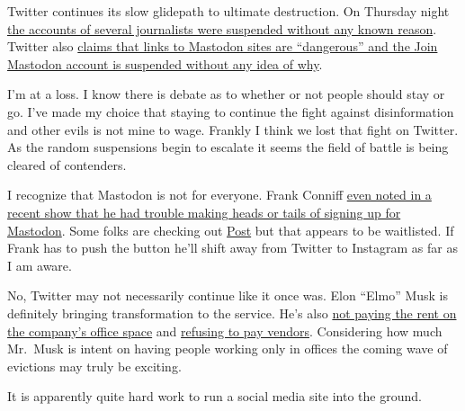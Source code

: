 Twitter continues its slow glidepath to ultimate destruction. On
Thursday night
\href{http://web.archive.org/web/20221216015528/https://www.axios.com/2022/12/16/elon-musk-twitter-free-speech-journalists-suspended}{the
accounts of several journalists were suspended without any known
reason}. Twitter also
\href{https://techcrunch.com/2022/12/15/elon-musk-suspends-mastodon-twitter-account-over-elonjet-tracking/}{claims
that links to Mastodon sites are ``dangerous'' and the Join Mastodon
account is suspended without any idea of why}.

I'm at a loss. I know there is debate as to whether or not people should
stay or go. I've made my choice that staying to continue the fight
against disinformation and other evils is not mine to wage. Frankly I
think we lost that fight on Twitter. As the random suspensions begin to
escalate it seems the field of battle is being cleared of contenders.

I recognize that Mastodon is not for everyone. Frank Conniff
\href{https://dumb-industries.com/dumb-video-all/teenagersfromouterspace}{even
noted in a recent show that he had trouble making heads or tails of
signing up for Mastodon}. Some folks are checking out
\href{https://post.news/}{Post} but that appears to be waitlisted. If
Frank has to push the button he'll shift away from Twitter to Instagram
as far as I am aware.

No, Twitter may not necessarily continue like it once was. Elon ``Elmo''
Musk is definitely bringing transformation to the service. He's also
\href{http://web.archive.org/web/20221214213558/https://commercialobserver.com/2022/12/twitters-new-york-landlord-silent-on-reports-elon-musk-not-paying-rent/}{not
paying the rent on the company's office space} and
\href{http://web.archive.org/web/20221215204200/https://www.axios.com/2022/12/14/twitter-elon-musk-paying-bills-rent}{refusing
to pay vendors}. Considering how much Mr.~Musk is intent on having
people working only in offices the coming wave of evictions may truly be
exciting.

It is apparently quite hard work to run a social media site into the
ground.
